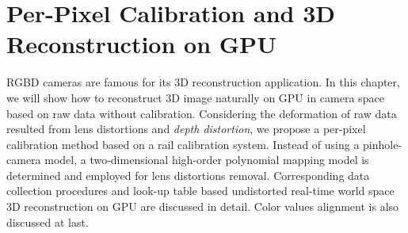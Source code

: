 \chapter{Per-Pixel Calibration and \gls{3D} Reconstruction on \gls{GPU}} %
\label{chapterDataBasedCalibration} 
%
%
%


%
%
%
%
\gls{RGBD} cameras are famous for its \gls{3D} reconstruction application. In this chapter, we will show how to reconstruct \gls{3D} image naturally on \gls{GPU} in camera space based on raw data without calibration. Considering the deformation of raw data resulted from lens distortions and \emph{depth distortion}, we propose a per-pixel calibration method based on a rail calibration system. Instead of using a pinhole-camera model, a two-dimensional high-order polynomial mapping model is determined and employed for lens distortions removal. Corresponding data collection procedures and look-up table based undistorted real-time world space \gls{3D} reconstruction on \gls{GPU} are discussed in detail. Color values alignment is also discussed at last.
%
